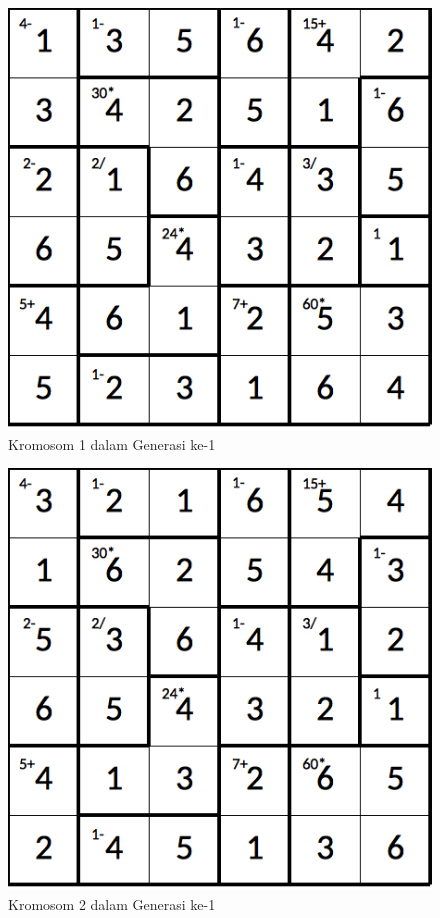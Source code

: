 \documentclass[a4paper,twoside]{article}
\begin{document}
\begin{enumerate}
\clearpage

\begin{figure}
\centering
\captionsetup{justification=centering}
\includegraphics[scale=0.333]{Gambar/hybridgenetic/Generation1Chromosome1}
\caption[Kromosom 1 dalam Generasi ke-1]{Kromosom 1 dalam Generasi ke-1}
\label{fig:analisisg1k1}
\end{figure}

\begin{figure}
\centering
\captionsetup{justification=centering}
\includegraphics[scale=0.333]{Gambar/hybridgenetic/Generation1Chromosome2}
\caption[Kromosom 2 dalam Generasi ke-1]{Kromosom 2 dalam Generasi ke-1}
\label{fig:analisisg1k2}
\end{figure}


\end{enumerate}
\end{document}
